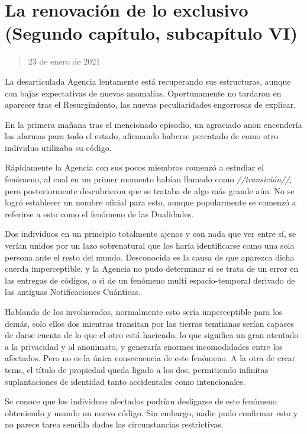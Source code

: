 \documentclass[
  spanish,
]{book}
\begin{document}
\hypertarget{la-renovaciuxf3n-de-lo-exclusivo-segundo-capuxedtulo-subcapuxedtulo-vi}{%
\section{La renovación de lo exclusivo (Segundo capítulo, subcapítulo VI)}\label{la-renovaciuxf3n-de-lo-exclusivo-segundo-capuxedtulo-subcapuxedtulo-vi}}

\begin{quote}
23 de enero de 2021
\end{quote}

La desarticulada Agencia lentamente está recuperando sus estructuras, aunque con bajas expectativas de nuevas anomalías. Oportunamente no tardaron en aparecer tras el Resurgimiento, las nuevas peculiaridades engorrosas de explicar.

En la primera mañana tras el mencionado episodio, un agraciado anon encendería las alarmas para todo el estado, afirmando haberse percatado de como otro individuo utilizaba su código.

Rápidamente la Agencia con sus pocos miembros comenzó a estudiar el fenómeno, al cual en un primer momento habían llamado como \emph{//transición//}, pero posteriormente descubrieron que se trataba de algo más grande aún. No se logró establecer un nombre oficial para esto, aunque popularmente se comenzó a referirse a esto como el fenómeno de las Dualidades.

Dos individuos en un principio totalmente ajenos y con nada que ver entre sí, se verían unidos por un lazo sobrenatural que los haría identificarse como una sola persona ante el resto del mundo. Desconocida es la causa de que aparezca dicha cuerda imperceptible, y la Agencia no pudo determinar si se trata de un error en las entregas de códigos, o si de un fenómeno multi espacio-temporal derivado de las antiguas Notificaciones Cuánticas.

Hablando de los involucrados, normalmente esto sería imperceptible para los demás, solo ellos dos mientras transitan por las tierras temtianas serían capaces de darse cuenta de lo que el otro está haciendo, lo que significa un gran atentado a la privacidad y al anonimato, y generaría enormes incomodidades entre los afectados. Pero no es la única consecuencia de este fenómeno. A la otra de crear tems, el título de propiedad queda ligado a los dos, permitiendo infinitas suplantaciones de identidad tanto accidentales como intencionales.

Se conoce que los individuos afectados podrían desligarse de este fenómeno obteniendo y usando un nuevo código. Sin embargo, nadie pudo confirmar esto y no parece tarea sencilla dadas las circunstancias restrictivas.
\end{document}
